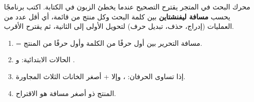 \clearpage
{}

\begin{statement}
محرك البحث في المتجر يقترح التصحيح عندما يخطئ الزبون في الكتابة. اكتب برنامجًا يحسب \textbf{مسافة ليفنشتاين} بين كلمة البحث  وكل منتج من قائمة، أي أقل عدد من العمليات (إدراج، حذف، تبديل حرف) لتحويل الأولى إلى الثانية، ثم يقترح الأقرب.
\end{statement}
\begin{stepsbox}\begin{enumerate}
\item {} = مسافة التحرير بين أول  حرفًا من الكلمة وأول  حرفًا من المنتج.
\item الحالات الابتدائية:  و .
\item إذا تساوى الحرفان: ، وإلا  + أصغر الخانات الثلاث المجاورة.
\item المنتج ذو أصغر مسافة هو الاقتراح.
\end{enumerate}\end{stepsbox}
